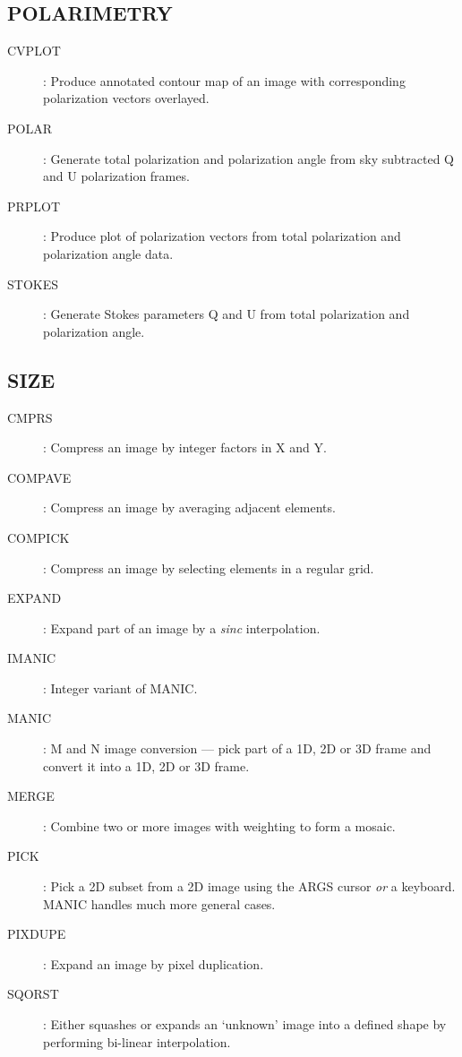 \subsection {POLARIMETRY}
\begin{description}
\begin{description}
\item [CVPLOT]: Produce annotated contour map of an image with corresponding
polarization vectors overlayed.
\item [POLAR]: Generate total polarization and polarization angle from sky
subtracted Q and U polarization frames.
\item [PRPLOT]: Produce plot of polarization vectors from total polarization
and polarization angle data.
\item [STOKES]: Generate Stokes parameters Q and U from total polarization
and polarization angle.
\end{description}
\end{description}
\subsection {SIZE}
\begin{description}
\begin{description}
\item [CMPRS]: Compress an image by integer factors in X and Y.
\item [COMPAVE]: Compress an image by averaging adjacent elements.
\item [COMPICK]: Compress an image by selecting elements in a regular grid.
\item [EXPAND]: Expand part of an image by a {\em sinc} interpolation.
\item [IMANIC]: Integer variant of MANIC.
\item [MANIC]: M and N image conversion --- pick part of a 1D, 2D or 3D frame
and convert it into a 1D, 2D or 3D frame.
\item [MERGE]: Combine two or more images with weighting to form a mosaic.
\item [PICK]: Pick a 2D subset from a 2D image using the ARGS cursor {\em or} a
keyboard.
MANIC handles much more general cases.
\item [PIXDUPE]: Expand an image by pixel duplication.
\item [SQORST]: Either squashes or expands an `unknown' image into a defined
shape by performing bi-linear interpolation.
\end{description}
\end{description}
\newpage

